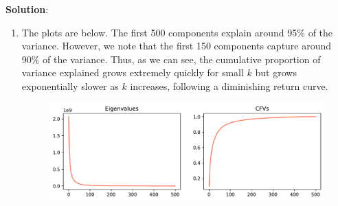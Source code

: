 \documentclass[submit]{../harvardml}
\newenvironment{solution}{
    \vspace{2mm}
    \color{blue}\noindent\textbf{Solution}:
}{}
\begin{document}
\begin{solution}
\begin{enumerate}
    \item The plots are below. The first 500 components explain around 95\% of the variance. However, we note that the first 150 components capture around 90\% of the variance. Thus, as we can see, the cumulative proportion of variance explained grows extremely quickly for small $k$ but grows exponentially slower as $k$ increases, following a diminishing return curve. 
    \begin{figure}[H]
        \centering
        \includegraphics[width=0.9\linewidth]{hw5/img_output/p3_cfvs.pdf}
    \end{figure}
    

\end{enumerate}
\end{solution}
\end{document}
